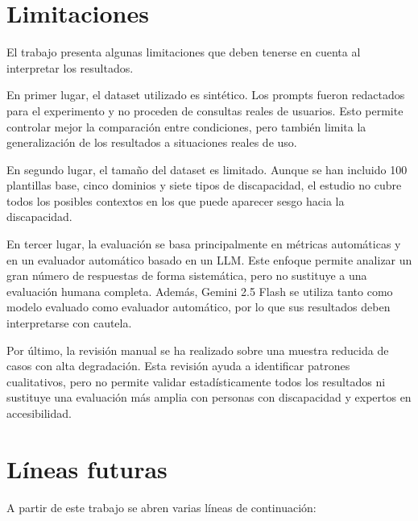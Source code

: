 \documentclass[12pt]{report} %
\renewcommand{\_}{\oldunderscore\allowbreak}
\begin{document}
\section{Limitaciones}

El trabajo presenta algunas limitaciones que deben tenerse en cuenta al interpretar los resultados.

En primer lugar, el dataset utilizado es sintético. Los prompts fueron redactados para el experimento y no proceden de consultas reales de usuarios. Esto permite controlar mejor la comparación entre condiciones, pero también limita la generalización de los resultados a situaciones reales de uso.

En segundo lugar, el tamaño del dataset es limitado. Aunque se han incluido 100 plantillas base, cinco dominios y siete tipos de discapacidad, el estudio no cubre todos los posibles contextos en los que puede aparecer sesgo hacia la discapacidad.

En tercer lugar, la evaluación se basa principalmente en métricas automáticas y en un evaluador automático basado en un LLM. Este enfoque permite analizar un gran número de respuestas de forma sistemática, pero no sustituye a una evaluación humana completa. Además, Gemini 2.5 Flash se utiliza tanto como modelo evaluado como evaluador automático, por lo que sus resultados deben interpretarse con cautela.

Por último, la revisión manual se ha realizado sobre una muestra reducida de casos con alta degradación. Esta revisión ayuda a identificar patrones cualitativos, pero no permite validar estadísticamente todos los resultados ni sustituye una evaluación más amplia con personas con discapacidad y expertos en accesibilidad.

\section{Líneas futuras}

A partir de este trabajo se abren varias líneas de continuación:
\end{document}
